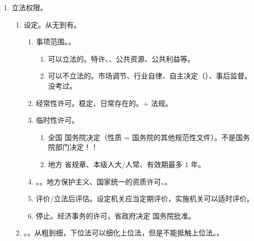 \begin{enumerate}
\begin{enumerate}
\begin{kk}{延期}
\begin{enumerate}
                    \item 在该许可有效期是否准予延续的决定 \yjt {}准予延续。
                  \end{enumerate}
                \end{kk}
          \item 有数量限制、无数量限制。原则根据受理顺序，特许是例外。
          \item 可转让、不可转让。一般不能转让，例外。采矿证之类的准物权。
        \end{enumerate}
  \item 立法权限。
        \begin{enumerate}
          \item 设定。从无到有。
                \begin{enumerate}
                  \item 事项范围。。
                        \begin{enumerate}
                          \item 可以立法的。特许、、公共资源、公共利益等。
                          \item 可以不立法的。市场调节、行业自律、自主决定（）、事后监督。没考过。
                        \end{enumerate}
                  \item 经常性许可。稳定、日常存在的。+ 法规。
                  \item 临时性许可。
                        \begin{enumerate}
                          \item 全国 \yjt 国务院决定（性质 = 国务院的其他规范性文件）。不是国务院部门决定！！
                          \item 地方 \yjt 省规章、本级人大/人常、有效期最多 1 年。
                        \end{enumerate}
                  \item {}。。地方保护主义、国家统一的资质许可、。
                  \item 评价/立法后评估。设定机关应当定期评价，实施机关可以适时评价。
                  \item 停止。经济事务的许可，省政府决定 \yjt 国务院批准。
                \end{enumerate}
          \item {}。。从粗到细，下位法可以细化上位法，但是不能抵触上位法。。

\end{enumerate}
\end{enumerate}

